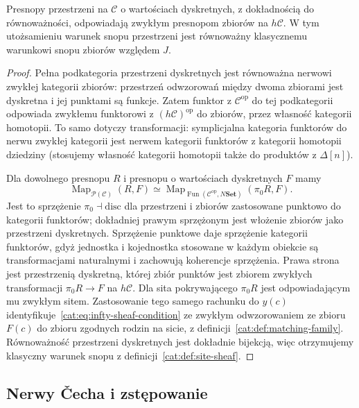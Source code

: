 \begin{stwierdzenie}\label{cat:prop:infty-sheaf-discrete}
Presnopy przestrzeni na $\mathcal C$ o wartościach dyskretnych, z dokładnością do równoważności, odpowiadają zwykłym presnopom zbiorów na $h\mathcal C$. W tym utożsamieniu warunek snopu przestrzeni jest równoważny klasycznemu warunkowi snopu zbiorów względem $J$.
\end{stwierdzenie}
\begin{proof}
Pełna podkategoria przestrzeni dyskretnych jest równoważna nerwowi zwykłej kategorii zbiorów: przestrzeń odwzorowań między dwoma zbiorami jest dyskretna i jej punktami są funkcje. Zatem funktor z $\mathcal C^{\mathrm{op}}$ do tej podkategorii odpowiada zwykłemu funktorowi z $(h\mathcal C)^{\mathrm{op}}$ do zbiorów, przez własność kategorii homotopii. To samo dotyczy transformacji: symplicjalna kategoria funktorów do nerwu zwykłej kategorii jest nerwem kategorii funktorów z kategorii homotopii dziedziny (stosujemy własność kategorii homotopii także do produktów z $\Delta[n]$).

Dla dowolnego presnopu $R$ i presnopu o wartościach dyskretnych $F$ mamy
\[
 \operatorname{Map}_{\mathcal P(\mathcal C)}(R,F)
 \simeq
 \operatorname{Map}_{\operatorname{Fun}(\mathcal C^{\mathrm{op}},N\mathbf{Set})}
 (\pi_0R,F).
\]
Jest to sprzężenie $\pi_0\dashv\mathrm{disc}$ dla przestrzeni i zbiorów zastosowane punktowo do kategorii funktorów; dokładniej prawym sprzężonym jest włożenie zbiorów jako przestrzeni dyskretnych. Sprzężenie punktowe daje sprzężenie kategorii funktorów, gdyż jednostka i kojednostka stosowane w każdym obiekcie są transformacjami naturalnymi i zachowują koherencje sprzężenia. Prawa strona jest przestrzenią dyskretną, której zbiór punktów jest zbiorem zwykłych transformacji $\pi_0R\to F$ na $h\mathcal C$. Dla sita pokrywającego $\pi_0R$ jest odpowiadającym mu zwykłym sitem. Zastosowanie tego samego rachunku do $y(c)$ identyfikuje~\eqref{cat:eq:infty-sheaf-condition} ze zwykłym odwzorowaniem ze zbioru $F(c)$ do zbioru zgodnych rodzin na sicie, z definicji~\ref{cat:def:matching-family}. Równoważność przestrzeni dyskretnych jest dokładnie bijekcją, więc otrzymujemy klasyczny warunek snopu z definicji~\ref{cat:def:site-sheaf}.
\end{proof}

\subsection{Nerwy Čecha i zstępowanie}

